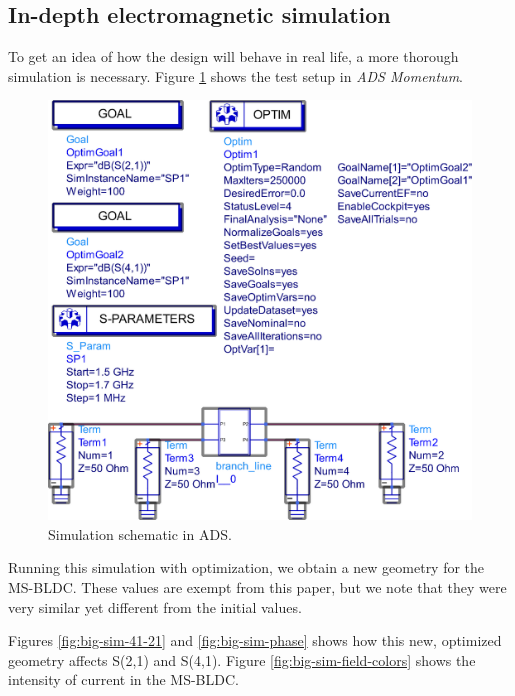 \subsection{In-depth electromagnetic simulation}

To get an idea of how the design will behave in real life, a more thorough simulation is necessary.
Figure \ref{fig:big-sim} shows the test setup in \emph{ADS Momentum}.

\begin{figure}[h t b p]
	\centering
	\includegraphics[width=\textwidth,keepaspectratio]{figures/big_sim_sch.eps}
	\caption{Simulation schematic in ADS.}
	\label{fig:big-sim}
\end{figure}

Running this simulation with optimization, we obtain a new geometry for the MS-BLDC.
These values are exempt from this paper, but we note that they were very similar yet different from the initial values. \par

Figures \ref{fig:big-sim-41-21} and \ref{fig:big-sim-phase} shows how this new, optimized geometry affects S(2,1) and S(4,1).
Figure \ref{fig:big-sim-field-colors} shows the intensity of current in the MS-BLDC.


